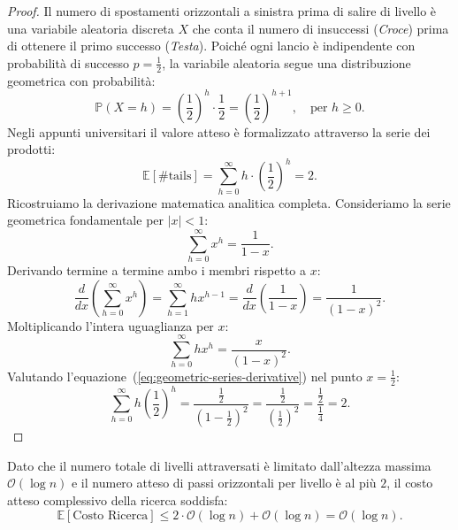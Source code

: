 \begin{proof}
Il numero di spostamenti orizzontali a sinistra prima di salire di livello è una variabile aleatoria discreta $X$ che conta il numero di insuccessi (\textit{Croce}) prima di ottenere il primo successo (\textit{Testa}). Poiché ogni lancio è indipendente con probabilità di successo $p = \frac{1}{2}$, la variabile aleatoria segue una distribuzione geometrica con probabilità:
\begin{equation}
  \mathbb{P}(X = h) = \left(\frac{1}{2}\right)^h \cdot \frac{1}{2} = \left(\frac{1}{2}\right)^{h+1}, \quad \text{per } h \ge 0.
\end{equation}
Negli appunti universitari il valore atteso è formalizzato attraverso la serie dei prodotti:
\begin{equation}
  \mathbb{E}[\# \text{tails}] = \sum_{h=0}^{\infty} h \cdot \left(\frac{1}{2}\right)^h = 2.
\end{equation}
Ricostruiamo la derivazione matematica analitica completa. Consideriamo la serie geometrica fondamentale per $|x| < 1$:
\begin{equation}
  \sum_{h=0}^{\infty} x^h = \frac{1}{1 - x}.
\end{equation}
Derivando termine a termine ambo i membri rispetto a $x$:
\begin{equation}
  \frac{d}{dx}\left(\sum_{h=0}^{\infty} x^h\right) = \sum_{h=1}^{\infty} h x^{h-1} = \frac{d}{dx}\left(\frac{1}{1 - x}\right) = \frac{1}{(1 - x)^2}.
\end{equation}
Moltiplicando l'intera uguaglianza per $x$:
\begin{equation}
  \sum_{h=0}^{\infty} h x^h = \frac{x}{(1 - x)^2}.
  \label{eq:geometric-series-derivative}
\end{equation}
Valutando l'equazione~(\ref{eq:geometric-series-derivative}) nel punto $x = \frac{1}{2}$:
\begin{equation}
  \sum_{h=0}^{\infty} h \left(\frac{1}{2}\right)^h = \frac{\frac{1}{2}}{\left(1 - \frac{1}{2}\right)^2} = \frac{\frac{1}{2}}{\left(\frac{1}{2}\right)^2} = \frac{\frac{1}{2}}{\frac{1}{4}} = 2.
\end{equation}
\end{proof}

\begin{theorem}
Dato che il numero totale di livelli attraversati è limitato dall'altezza massima $\mathcal{O}(\log n)$ e il numero atteso di passi orizzontali per livello è al più $2$, il costo atteso complessivo della ricerca soddisfa:
\begin{equation}
  \mathbb{E}[\text{Costo Ricerca}] \le 2 \cdot \mathcal{O}(\log n) + \mathcal{O}(\log n) = \mathcal{O}(\log n).
\end{equation}
\end{theorem}

